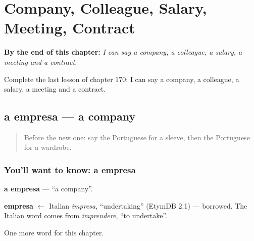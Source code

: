 
\chapter{Company, Colleague, Salary, Meeting, Contract}
\label{ch:pt-company-colleague-salary-meeting-contract}

\begin{chapteropening}
\textbf{By the end of this chapter:} \emph{I can say a company, a colleague, a salary, a meeting and a contract.}

Complete the last lesson of chapter 170: I can say a company, a colleague, a salary, a meeting and a contract.
\end{chapteropening}

\section[a empresa]{a empresa — a company}

\label{lesson:PT-C170-empresa}



\begin{quote}
Before the new one: say the Portuguese for a sleeve, then the Portuguese for a wardrobe.
\end{quote}

\subsection*{You'll want to know: a empresa}
\textbf{a empresa} — \textquotedblleft{}a company\textquotedblright{}.

\begin{cousinweb}
\textbf{empresa} $\leftarrow$ Italian \emph{impresa}, \textquotedblleft{}undertaking\textquotedblright{} (EtymDB 2.1) — borrowed. The Italian word comes from \emph{imprendere}, \textquotedblleft{}to undertake\textquotedblright{}.
\end{cousinweb}

\begin{grammarlens}[title={What you've built}]
One more word for this chapter.
\end{grammarlens}

